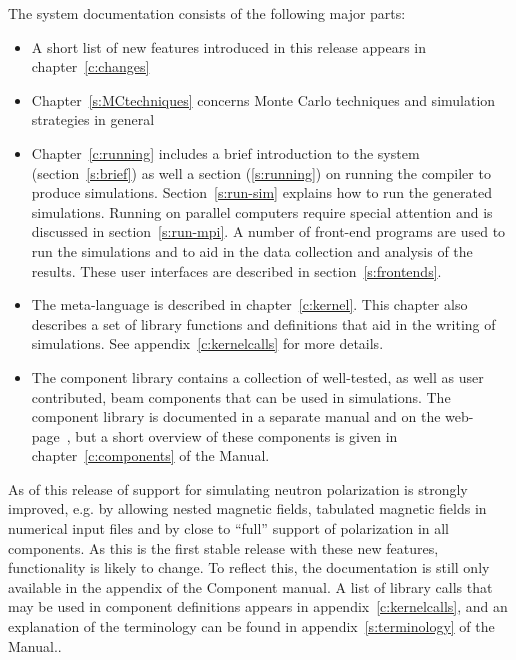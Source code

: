 The \MCS system documentation consists of the following major
parts:
\begin{itemize}
\item A short list of new features introduced in this \MCS release
  appears in chapter~\ref{c:changes}
\item Chapter~\ref{s:MCtechniques} concerns Monte Carlo techniques
  and simulation strategies in general
\item Chapter~\ref{c:running} includes a brief introduction to the
  \MCS system
  (section~\ref{s:brief}) as well a section (\ref{s:running}) on running the compiler to produce
  simulations. Section~\ref{s:run-sim} explains how to run the generated
  simulations. Running \MCS on parallel computers require special
  attention and is discussed in section~\ref{s:run-mpi}. A number of front-end programs are used to run the
  simulations and to aid in the data collection and analysis of the
  results. These user interfaces are described in section~\ref{s:frontends}.
\item The \MCS meta-language is described in chapter~\ref{c:kernel}. This
  chapter also describes a set of library functions and definitions
  that aid in the writing of simulations. See
  appendix~\ref{c:kernelcalls} for more details.
\item The \MCS component library contains a collection of
  well-tested, as well as user contributed, beam components that can be used in simulations.
  The \MCS component library is documented in a separate manual
  and on the \MCS web-page~\cite{mcstas_webpage}, but a short overview of these
  components is given in chapter~\ref{c:components} of the Manual.

\end{itemize}

As of this release of \MCS support for simulating neutron
polarization is strongly improved, e.g. by allowing nested magnetic
fields, tabulated magnetic fields in numerical input files and by close
to ``full'' support of polarization in all components. As this is the
first stable release with these new features, functionality is likely to change. To reflect this, the
documentation is still only available in the appendix of the Component manual. %
A list of library calls that may be used in component definitions
appears in appendix~\ref{c:kernelcalls}, and
an explanation of the \MCS terminology can be
found in appendix~\ref{s:terminology} of the Manual..


